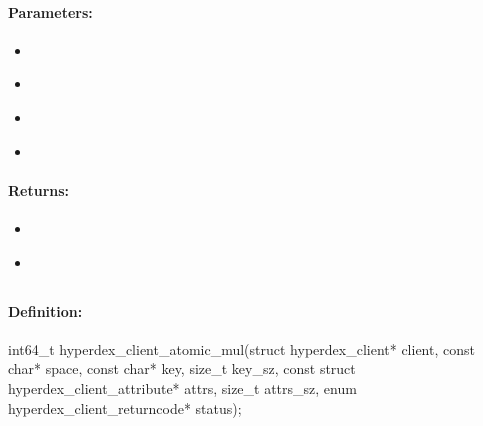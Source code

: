 \paragraph{Parameters:}
\begin{itemize}[noitemsep]
\item {}\\

\item {}\\

\item {}\\

\item {}\\

\end{itemize}

\paragraph{Returns:}
\begin{itemize}[noitemsep]
\item {}\\

\item {}\\

\end{itemize}

\pagebreak
\subsection{}
\label{api:c:atomic_mul}


\paragraph{Definition:}
\begin{ccode}
int64_t hyperdex_client_atomic_mul(struct hyperdex_client* client,
        const char* space,
        const char* key, size_t key_sz,
        const struct hyperdex_client_attribute* attrs, size_t attrs_sz,
        enum hyperdex_client_returncode* status);
\end{ccode}

